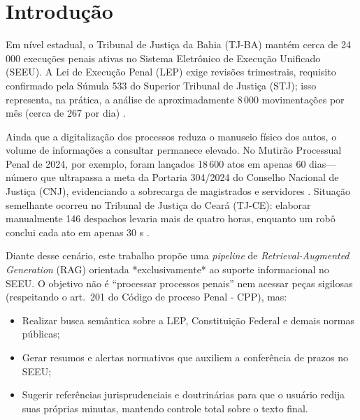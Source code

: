 
\chapter{Introdução}
\label{sec:introducao}

Em nível estadual, o Tribunal de Justiça da Bahia (TJ-BA) mantém cerca de
24\,000 execuções penais ativas no Sistema Eletrônico de Execução Unificado
(SEEU). A Lei de Execução Penal (LEP) exige revisões trimestrais, requisito
confirmado pela Súmula 533 do Superior Tribunal de Justiça (STJ); isso
representa, na prática, a análise de aproximadamente 8\,000 movimentações por
mês (cerca de 267 por dia) \cite{brasil1984lep,stj2015sumula533}.

Ainda que a digitalização dos processos reduza o manuseio físico dos autos, o
volume de informações a consultar permanece elevado. No Mutirão Processual Penal
de 2024, por exemplo, foram lançados 18\,600 atos em apenas 60 dias—número que
ultrapassa a meta da Portaria 304/2024 do Conselho Nacional de Justiça (CNJ),
evidenciando a sobrecarga de magistrados e servidores
\cite{tjba2024mutirao,cnj2024portaria304}. Situação semelhante ocorreu no
Tribunal de Justiça do Ceará (TJ-CE): elaborar manualmente 146 despachos
levaria mais de quatro horas, enquanto um robô conclui cada ato em apenas 30 s
\cite{tjce2023robos}.

Diante desse cenário, este trabalho propõe uma \emph{pipeline} de
\emph{Retrieval-Augmented Generation} (RAG) orientada *exclusivamente* ao
suporte informacional no SEEU. O objetivo não é “processar processos penais” nem
acessar peças sigilosas (respeitando o art.~201 do  Código de proceso Penal - CPP), mas:

\begin{itemize}
  \item Realizar busca semântica sobre a LEP, Constituição Federal e demais
        normas públicas;
  \item Gerar resumos e alertas normativos que auxiliem a conferência de prazos
        no SEEU;
  \item Sugerir referências jurisprudenciais e doutrinárias para que o usuário
        redija suas próprias minutas, mantendo controle total sobre o texto
        final.
\end{itemize}


